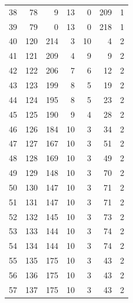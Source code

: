 \documentclass[a4paper,twoside,12pt]{book}
\begin{document}
\begin{appendices}
\begin{table}
\begin{tabular}{lrrrrrr}
		38  &     78 &         9 &        13 &               0 &             209 &         1 \\
		39  &     79 &         0 &        13 &               0 &             218 &         1 \\
		40  &    120 &       214 &         3 &              10 &               4 &         2 \\
		41  &    121 &       209 &         4 &               9 &               9 &         2 \\
		42  &    122 &       206 &         7 &               6 &              12 &         2 \\
		43  &    123 &       199 &         8 &               5 &              19 &         2 \\
		44  &    124 &       195 &         8 &               5 &              23 &         2 \\
		45  &    125 &       190 &         9 &               4 &              28 &         2 \\
		46  &    126 &       184 &        10 &               3 &              34 &         2 \\
		47  &    127 &       167 &        10 &               3 &              51 &         2 \\
		48  &    128 &       169 &        10 &               3 &              49 &         2 \\
		49  &    129 &       148 &        10 &               3 &              70 &         2 \\
		50  &    130 &       147 &        10 &               3 &              71 &         2 \\
		51  &    131 &       147 &        10 &               3 &              71 &         2 \\
		52  &    132 &       145 &        10 &               3 &              73 &         2 \\
		53  &    133 &       144 &        10 &               3 &              74 &         2 \\
		54  &    134 &       144 &        10 &               3 &              74 &         2 \\
		55  &    135 &       175 &        10 &               3 &              43 &         2 \\
		56  &    136 &       175 &        10 &               3 &              43 &         2 \\
		57  &    137 &       175 &        10 &               3 &              43 &         2 \\

\end{tabular}
\end{table}
\end{appendices}
\end{document}
